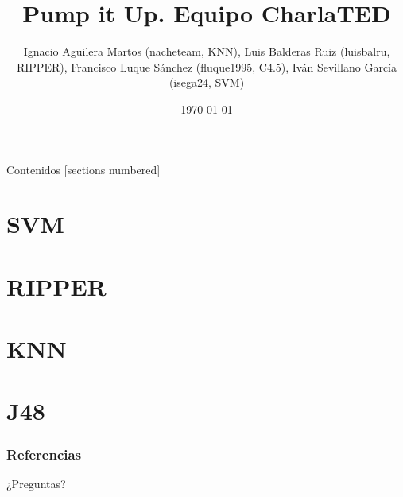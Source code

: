 \documentclass[10pt]{beamer}
\title{Pump it Up. Equipo CharlaTED}
\author{Ignacio Aguilera Martos (nacheteam, KNN),
  Luis Balderas Ruiz (luisbalru, RIPPER),
  Francisco Luque Sánchez (fluque1995, C4.5),
  Iván Sevillano García (isega24, SVM)}
\date{\today}
\institute{Preprocesamiento y Clasificación}
\begin{document}
\maketitle

\begin{frame}[fragile]{Contenidos}
[sections numbered]
\tableofcontents[hideallsubsections]
\end{frame}

\section{SVM}


\section{RIPPER}


\section{KNN}


\section{J48}


\begin{frame}[allowframebreaks]
\frametitle{Referencias}
\nocite{*}


\end{frame}

\begin{frame}[standout]
\LARGE{¿Preguntas?}
\vspace{10px}

\end{frame}
\end{document}
